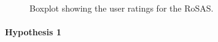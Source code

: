 \documentclass[twocolumn]{svjour3}          %
\begin{document}
% 

% 

% 

\begin{figure}[bt]
 \caption{\label{fig:adapt:rosas}Boxplot showing the user ratings for the RoSAS.}\label{fig:unnamed-chunk-6}
\end{figure}

% 

\hypertarget{competence}{%
\paragraph{Hypothesis 1}\label{competence}}
\end{document}
